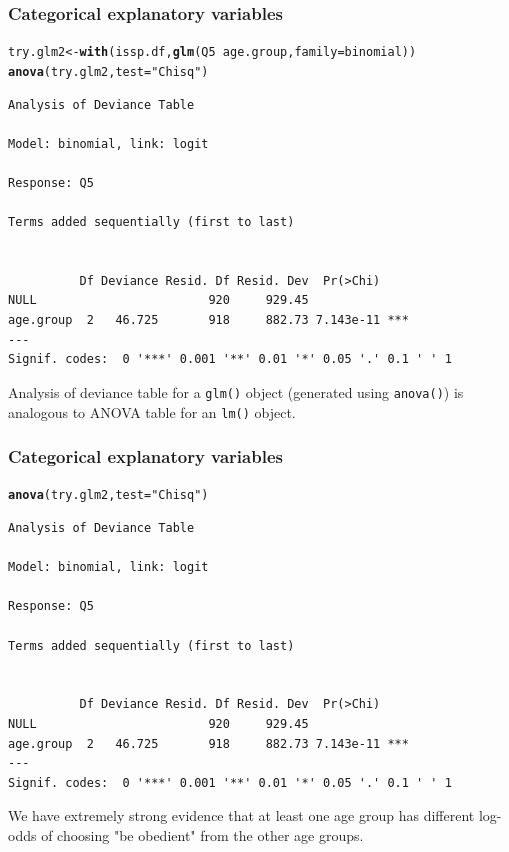 \documentclass{beamer}\usepackage[]{graphicx}\usepackage[]{color}
\makeatletter
\newcommand{\hlstr}[1]{\textcolor[rgb]{0.192,0.494,0.8}{#1}}%
\newcommand{\hlopt}[1]{\textcolor[rgb]{0,0,0}{#1}}%
\newcommand{\hlstd}[1]{\textcolor[rgb]{0.345,0.345,0.345}{#1}}%
\newcommand{\hlkwb}[1]{\textcolor[rgb]{0.69,0.353,0.396}{#1}}%
\newcommand{\hlkwc}[1]{\textcolor[rgb]{0.333,0.667,0.333}{#1}}%
\newcommand{\hlkwd}[1]{\textcolor[rgb]{0.737,0.353,0.396}{\textbf{#1}}}%
\newenvironment{kframe}{%
 \def\at@end@of@kframe{}%
 \ifinner\ifhmode%
  \def\at@end@of@kframe{\end{minipage}}%
  \begin{minipage}{\columnwidth}%
 \fi\fi%
 \def\FrameCommand##1{\hskip\@totalleftmargin \hskip-\fboxsep
 \colorbox{shadecolor}{##1}\hskip-\fboxsep
     \hskip-\linewidth \hskip-\@totalleftmargin \hskip\columnwidth}%
 \MakeFramed {\advance\hsize-\width
   \@totalleftmargin\z@ \linewidth\hsize
   \@setminipage}}%
 {\par\unskip\endMakeFramed%
 \at@end@of@kframe}
\newenvironment{knitrout}{}{} %
\makeatother
\begin{document}
\begin{frame}[fragile]
\frametitle{Categorical explanatory variables}
\begin{scriptsize}
\begin{knitrout}
\color{fgcolor}\begin{kframe}
\begin{alltt}
\hlstd{try.glm2} \hlkwb{<-} \hlkwd{with}\hlstd{(issp.df,} \hlkwd{glm}\hlstd{(Q5}\hlopt{~}\hlstd{age.group,} \hlkwc{family} \hlstd{= binomial))}
\hlkwd{anova}\hlstd{(try.glm2,} \hlkwc{test} \hlstd{=} \hlstr{"Chisq"}\hlstd{)}
\end{alltt}
\begin{verbatim}
Analysis of Deviance Table

Model: binomial, link: logit

Response: Q5

Terms added sequentially (first to last)


          Df Deviance Resid. Df Resid. Dev  Pr(>Chi)    
NULL                        920     929.45              
age.group  2   46.725       918     882.73 7.143e-11 ***
---
Signif. codes:  0 '***' 0.001 '**' 0.01 '*' 0.05 '.' 0.1 ' ' 1
\end{verbatim}
\end{kframe}
\end{knitrout}
\end{scriptsize}
Analysis of deviance table for a \texttt{glm()} object (generated using \texttt{anova()}) is analogous to ANOVA table for an \texttt{lm()} object.
\end{frame}


\begin{frame}[fragile]
\frametitle{Categorical explanatory variables}
\begin{scriptsize}
\begin{knitrout}
\color{fgcolor}\begin{kframe}
\begin{alltt}
\hlkwd{anova}\hlstd{(try.glm2,} \hlkwc{test} \hlstd{=} \hlstr{"Chisq"}\hlstd{)}
\end{alltt}
\begin{verbatim}
Analysis of Deviance Table

Model: binomial, link: logit

Response: Q5

Terms added sequentially (first to last)


          Df Deviance Resid. Df Resid. Dev  Pr(>Chi)    
NULL                        920     929.45              
age.group  2   46.725       918     882.73 7.143e-11 ***
---
Signif. codes:  0 '***' 0.001 '**' 0.01 '*' 0.05 '.' 0.1 ' ' 1
\end{verbatim}
\end{kframe}
\end{knitrout}
\end{scriptsize}
We have extremely strong evidence that at least one age group has different log-odds of choosing "be obedient" from the other age groups.
\end{frame}
\end{document}
